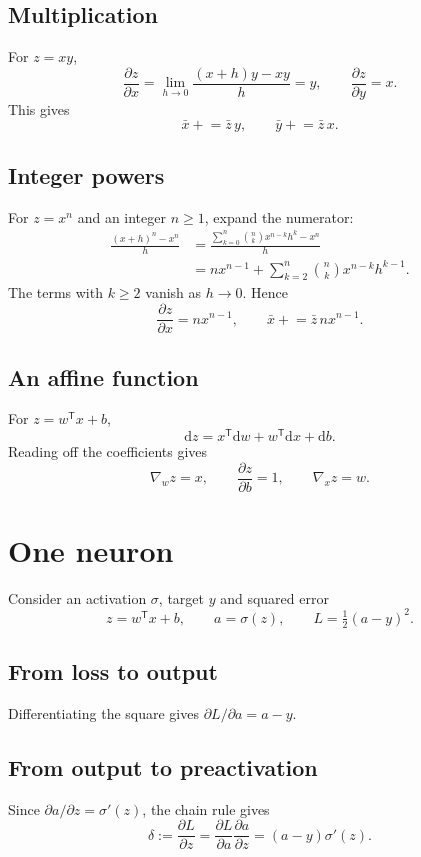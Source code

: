 \documentclass[11pt,a4paper]{article}
\newcommand{\dd}{\mathrm{d}}
\newcommand{\T}{\mathsf{T}}
\begin{document}
\subsection{Multiplication}
For $z=xy$,
\[
\frac{\partial z}{\partial x}
=\lim_{h\to0}\frac{(x+h)y-xy}{h}=y,\qquad
\frac{\partial z}{\partial y}=x.
\]
This gives
\[
\bar x \mathrel{+}= \bar z\,y,\qquad \bar y \mathrel{+}= \bar z\,x.
\]

\subsection{Integer powers}
For $z=x^n$ and an integer $n\geq 1$, expand the numerator:
\begin{align*}
\frac{(x+h)^n-x^n}{h}
&=\frac{\sum_{k=0}^{n}\binom{n}{k}x^{n-k}h^k-x^n}{h}\\
&=nx^{n-1}+\sum_{k=2}^{n}\binom{n}{k}x^{n-k}h^{k-1}.
\end{align*}
The terms with $k\geq2$ vanish as $h\to0$. Hence
\[
\frac{\partial z}{\partial x}=nx^{n-1},\qquad
\bar x\mathrel{+}=\bar z\,n x^{n-1}.
\]

\subsection{An affine function}
For $z=w^\T x+b$,
\[
\dd z=x^\T\dd w+w^\T\dd x+\dd b.
\]
Reading off the coefficients gives
\[
\nabla_w z=x,\qquad \frac{\partial z}{\partial b}=1,\qquad \nabla_x z=w.
\]

\section{One neuron}
Consider an activation $\sigma$, target $y$ and squared error
\[
z=w^\T x+b,\qquad a=\sigma(z),\qquad L=\tfrac12(a-y)^2.
\]

\subsection{From loss to output}
Differentiating the square gives $\partial L/\partial a=a-y$.

\subsection{From output to preactivation}
Since $\partial a/\partial z=\sigma'(z)$, the chain rule gives
\[
\delta:=\frac{\partial L}{\partial z}
=\frac{\partial L}{\partial a}\frac{\partial a}{\partial z}
=(a-y)\sigma'(z).
\]
\end{document}

